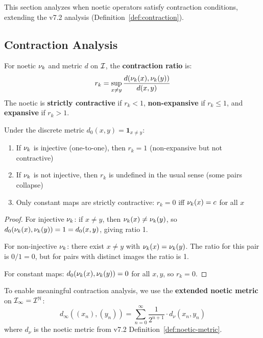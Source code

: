 \begin{tcolorbox}[colback=blue!5!white,colframe=blue!75!black,title=\vnewthree]
This section analyzes when noetic operators satisfy contraction conditions, extending the v7.2 analysis (Definition~\ref*{def:contraction}).
\end{tcolorbox}

\subsection{Contraction Analysis}

\begin{definition}
\label{def:noetic-contraction-ratio}
For noetic $\nu_{k}$ and metric $d$ on $\mathcal{I}$, the \textbf{contraction ratio} is:
\[
r_k = \sup_{x \neq y} \frac{d(\nu_{k}(x), \nu_{k}(y))}{d(x, y)}
\]
The noetic is \textbf{strictly contractive} if $r_k < 1$, \textbf{non-expansive} if $r_k \leq 1$, and \textbf{expansive} if $r_k > 1$.
\end{definition}

\begin{proposition}
\label{prop:discrete-obstruction}
Under the discrete metric $d_0(x, y) = \mathbf{1}_{x \neq y}$:
\begin{enumerate}[label=(\roman*)]
  \item If $\nu_{k}$ is injective (one-to-one), then $r_k = 1$ (non-expansive but not contractive)
  \item If $\nu_{k}$ is not injective, then $r_k$ is undefined in the usual sense (some pairs collapse)
  \item Only constant maps are strictly contractive: $r_k = 0$ iff $\nu_{k}(x) = c$ for all $x$
\end{enumerate}
\end{proposition}

\begin{proof}
For injective $\nu_{k}$: if $x \neq y$, then $\nu_{k}(x) \neq \nu_{k}(y)$, so $d_0(\nu_{k}(x), \nu_{k}(y)) = 1 = d_0(x, y)$, giving ratio 1.

For non-injective $\nu_{k}$: there exist $x \neq y$ with $\nu_{k}(x) = \nu_{k}(y)$. The ratio for this pair is $0/1 = 0$, but for pairs with distinct images the ratio is 1.

For constant maps: $d_0(\nu_{k}(x), \nu_{k}(y)) = 0$ for all $x, y$, so $r_k = 0$.
\end{proof}

\begin{definition}
\label{def:extended-noetic-metric}
To enable meaningful contraction analysis, we use the \textbf{extended noetic metric} on $\mathcal{I}_\infty = \mathcal{I}^\mathbb{N}$:
\[
d_\infty((x_n), (y_n)) = \sum_{n=0}^\infty \frac{1}{2^{n+1}} \cdot d_\nu(x_n, y_n)
\]
where $d_\nu$ is the noetic metric from v7.2 Definition~\ref*{def:noetic-metric}.
\end{definition}

